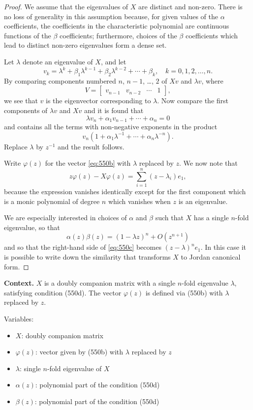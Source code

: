 \begin{proof}
We assume that the eigenvalues of \(X\) are distinct and non-zero. There is no loss of generality in this assumption because, for given values of the \(\alpha\) coefficients, the coefficients in the characteristic polynomial are continuous functions of the \(\beta\) coefficients; furthermore, choices of the \(\beta\) coefficients which lead to distinct non-zero eigenvalues form a dense set.

Let \(\lambda\) denote an eigenvalue of \(X\), and let
\[
v_k = \lambda^k + \beta_1 \lambda^{k-1} + \beta_2 \lambda^{k-2} + \cdots + \beta_k, \quad k = 0, 1, 2, \dots, n.
\]
By comparing components numbered \(n\), \(n-1\), \dots, \(2\) of \(Xv\) and \(\lambda v\), where
\[
V = \begin{bmatrix} v_{n-1} & v_{n-2} & \cdots & 1 \end{bmatrix}, \tag{550b}
\]
we see that \(v\) is the eigenvector corresponding to \(\lambda\). Now compare the first components of \(\lambda v\) and \(Xv\) and it is found that
\[
\lambda v_n + \alpha_1 v_{n-1} + \cdots + \alpha_n = 0
\]
and contains all the terms with non-negative exponents in the product
\[
v_n (1 + \alpha_1 \lambda^{-1} + \cdots + \alpha_n \lambda^{-n}).
\]
Replace \(\lambda\) by \(z^{-1}\) and the result follows.

Write \(\varphi(z)\) for the vector \eqref{eq:550b} with \(\lambda\) replaced by \(z\). We now note that
\[
z\varphi(z) - X\varphi(z) = \sum_{i=1}^n (z - \lambda_i) e_1, \tag{550c}
\]
because the expression vanishes identically except for the first component which is a monic polynomial of degree \(n\) which vanishes when \(z\) is an eigenvalue.

We are especially interested in choices of \(\alpha\) and \(\beta\) such that \(X\) has a single \(n\)-fold eigenvalue, so that
\[
\alpha(z)\beta(z) = (1 - \lambda z)^n + O(z^{n+1}) \tag{550d}
\]
and so that the right-hand side of \eqref{eq:550c} becomes \((z - \lambda)^n e_1\). In this case it is possible to write down the similarity that transforms \(X\) to Jordan canonical form.
\end{proof}

\noindent\textbf{Context.}
$X$ is a doubly companion matrix with a single $n$-fold eigenvalue $\lambda$, satisfying condition (550d). The vector $\varphi(z)$ is defined via (550b) with $\lambda$ replaced by $z$.

Variables:
\begin{itemize}
    \item $X$: doubly companion matrix
    \item $\varphi(z)$: vector given by (550b) with $\lambda$ replaced by $z$
    \item $\lambda$: single $n$-fold eigenvalue of $X$
    \item $\alpha(z)$: polynomial part of the condition (550d)
    \item $\beta(z)$: polynomial part of the condition (550d)
\end{itemize}

